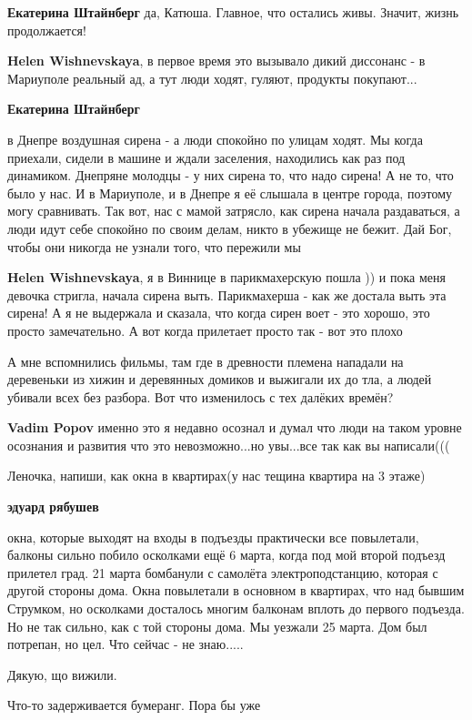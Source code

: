 \begin{itemize} %
\textbf{Екатерина Штайнберг} да, Катюша. Главное, что остались живы. Значит, жизнь продолжается!

\textbf{Helen Wishnevskaya}, в первое время это вызывало дикий диссонанс - в Мариуполе реальный ад, а тут люди ходят, гуляют, продукты покупают...

\textbf{Екатерина Штайнберг} 

в Днепре воздушная сирена - а люди спокойно по улицам ходят. Мы когда приехали,
сидели в машине и ждали заселения, находились как раз под динамиком. Днепряне
молодцы - у них сирена то, что надо сирена! А не то, что было у нас. И в
Мариуполе, и в Днепре я её слышала в центре города, поэтому могу сравнивать.
Так вот, нас с мамой затрясло, как сирена начала раздаваться, а люди идут себе
спокойно по своим делам, никто в убежище не бежит. Дай Бог, чтобы они никогда
не узнали того, что пережили мы

\textbf{Helen Wishnevskaya}, я в Виннице в парикмахерскую пошла )) и пока меня девочка стригла, начала сирена выть. Парикмахерша - как же достала выть эта сирена! А я не выдержала и сказала, что когда сирен воет - это хорошо, это просто замечательно. А вот когда прилетает просто так - вот это плохо
\end{itemize} %


А мне вспомнились фильмы, там где в древности племена нападали на деревеньки из
хижин и деревянных домиков и выжигали их до тла, а людей убивали всех без
разбора. Вот что изменилось с тех далёких времён?

\begin{itemize} %
\textbf{Vadim Popov} именно это я недавно осознал и думал что люди на таком уровне осознания и развития что это невозможно...но увы...все так как вы написали(((
\end{itemize} %


Леночка, напиши, как окна в квартирах(у нас тещина квартира на 3 этаже)

\textbf{эдуард рябушев} 

окна, которые выходят на входы в подъезды практически все повылетали, балконы
сильно побило осколками ещё 6 марта, когда под мой второй подъезд прилетел
град. 21 марта бомбанули с самолёта электроподстанцию, которая с другой стороны
дома. Окна повылетали в основном в квартирах, что над бывшим Струмком, но
осколками досталось многим балконам вплоть до первого подъезда. Но не так
сильно, как с той стороны дома. Мы уезжали 25 марта. Дом был потрепан, но цел.
Что сейчас - не знаю.....


Дякую, що вижили.


Что-то задерживается бумеранг. Пора бы уже
